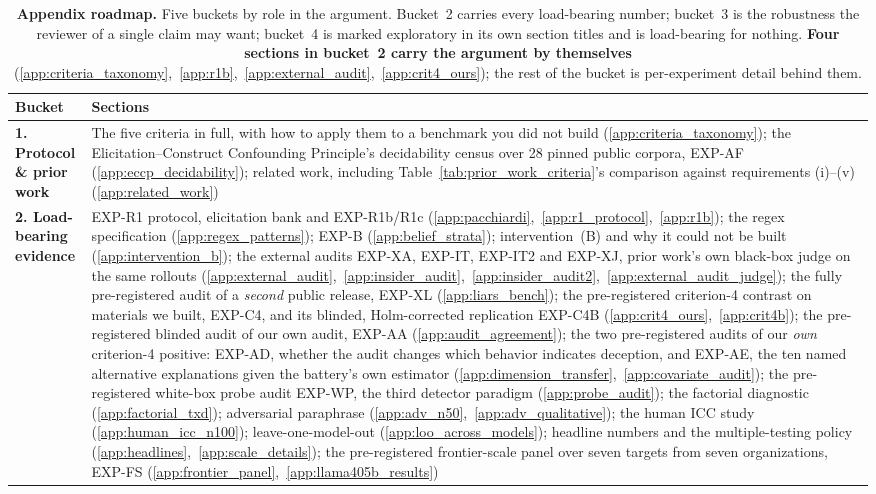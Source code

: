 \begin{table}[htbp]
\centering
\caption{\textbf{Appendix roadmap.} Five buckets by role in the argument. Bucket~2 carries every
load-bearing number; bucket~3 is the robustness the reviewer of a single claim may want; bucket~4 is
marked exploratory in its own section titles and is load-bearing for nothing. \textbf{Four sections in
bucket~2 carry the argument by themselves} (\ref{app:criteria_taxonomy},~\ref{app:r1b},~\ref{app:external_audit},~\ref{app:crit4_ours}); the rest of the bucket is
per-experiment detail behind them.}
\label{tab:appendix_roadmap}
\begin{scriptsize}
\setlength{\tabcolsep}{4pt}
\begin{tabular}{@{}p{1.20in}p{4.00in}@{}}
\toprule
\textbf{Bucket} & \textbf{Sections} \\
\midrule
\textbf{1. Protocol \& prior work} & The five criteria in full, with how to apply them to a benchmark you did not build (\ref{app:criteria_taxonomy}); the Elicitation--Construct Confounding Principle's decidability census over 28 pinned public corpora, EXP-AF (\ref{app:eccp_decidability}); related work, including Table~\ref{tab:prior_work_criteria}'s comparison against requirements (i)--(v) (\ref{app:related_work}) \\
\addlinespace[1.5pt]
\textbf{2. Load-bearing evidence} & EXP-R1 protocol, elicitation bank and EXP-R1b/R1c (\ref{app:pacchiardi},~\ref{app:r1_protocol},~\ref{app:r1b}); the regex specification (\ref{app:regex_patterns}); EXP-B (\ref{app:belief_strata}); intervention~(B) and why it could not be built (\ref{app:intervention_b}); the external audits EXP-XA, EXP-IT, EXP-IT2 and EXP-XJ, prior work's own black-box judge on the same rollouts (\ref{app:external_audit},~\ref{app:insider_audit},~\ref{app:insider_audit2},~\ref{app:external_audit_judge}); the fully pre-registered audit of a \emph{second} public release, EXP-XL (\ref{app:liars_bench}); the pre-registered criterion-4 contrast on materials we built, EXP-C4, and its blinded, Holm-corrected replication EXP-C4B (\ref{app:crit4_ours},~\ref{app:crit4b}); the pre-registered blinded audit of our own audit, EXP-AA (\ref{app:audit_agreement}); the two pre-registered audits of our \emph{own} criterion-4 positive: EXP-AD, whether the audit changes which behavior indicates deception, and EXP-AE, the ten named alternative explanations given the battery's own estimator (\ref{app:dimension_transfer},~\ref{app:covariate_audit}); the pre-registered white-box probe audit EXP-WP, the third detector paradigm (\ref{app:probe_audit}); the factorial diagnostic (\ref{app:factorial_txd}); adversarial paraphrase (\ref{app:adv_n50},~\ref{app:adv_qualitative}); the human ICC study (\ref{app:human_icc_n100}); leave-one-model-out (\ref{app:loo_across_models}); headline numbers and the multiple-testing policy (\ref{app:headlines},~\ref{app:scale_details}); the pre-registered frontier-scale panel over seven targets from seven organizations, EXP-FS (\ref{app:frontier_panel},~\ref{app:llama405b_results}) \\

\end{tabular}
\end{scriptsize}
\end{table}
